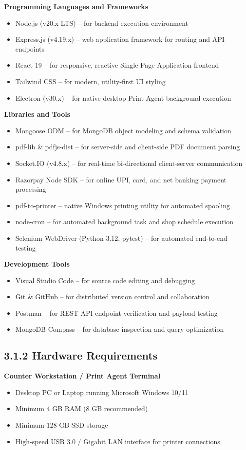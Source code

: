\documentclass[12pt,a4paper]{report}
\begin{document}
\noindent\textbf{Programming Languages and Frameworks}
\begin{itemize}[leftmargin=0.35in, itemsep=2pt]
  \item Node.js (v20.x LTS) -- for backend execution environment
  \item Express.js (v4.19.x) -- web application framework for routing and API endpoints
  \item React 19 -- for responsive, reactive Single Page Application frontend
  \item Tailwind CSS -- for modern, utility-first UI styling
  \item Electron (v30.x) -- for native desktop Print Agent background execution
\end{itemize}

\noindent\textbf{Libraries and Tools}
\begin{itemize}[leftmargin=0.35in, itemsep=2pt]
  \item Mongoose ODM -- for MongoDB object modeling and schema validation
  \item pdf-lib \& pdfjs-dist -- for server-side and client-side PDF document parsing
  \item Socket.IO (v4.8.x) -- for real-time bi-directional client-server communication
  \item Razorpay Node SDK -- for online UPI, card, and net banking payment processing
  \item pdf-to-printer -- native Windows printing utility for automated spooling
  \item node-cron -- for automated background task and shop schedule execution
  \item Selenium WebDriver (Python 3.12, pytest) -- for automated end-to-end testing
\end{itemize}

\noindent\textbf{Development Tools}
\begin{itemize}[leftmargin=0.35in, itemsep=2pt]
  \item Visual Studio Code -- for source code editing and debugging
  \item Git \& GitHub -- for distributed version control and collaboration
  \item Postman -- for REST API endpoint verification and payload testing
  \item MongoDB Compass -- for database inspection and query optimization
\end{itemize}

\subsection{3.1.2 Hardware Requirements}
\noindent\textbf{Counter Workstation / Print Agent Terminal}
\begin{itemize}[leftmargin=0.35in, itemsep=2pt]
  \item Desktop PC or Laptop running Microsoft Windows 10/11
  \item Minimum 4 GB RAM (8 GB recommended)
  \item Minimum 128 GB SSD storage
  \item High-speed USB 3.0 / Gigabit LAN interface for printer connections
\end{itemize}
\end{document}
